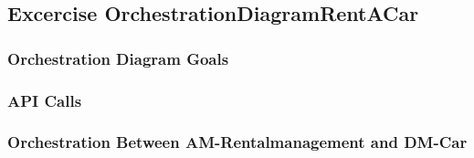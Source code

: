 \subsection{Excercise OrchestrationDiagramRentACar}
\subsubsection*{Orchestration Diagram Goals}


\subsubsection*{API Calls}



\subsubsection*{Orchestration Between AM-Rentalmanagement and DM-Car}



